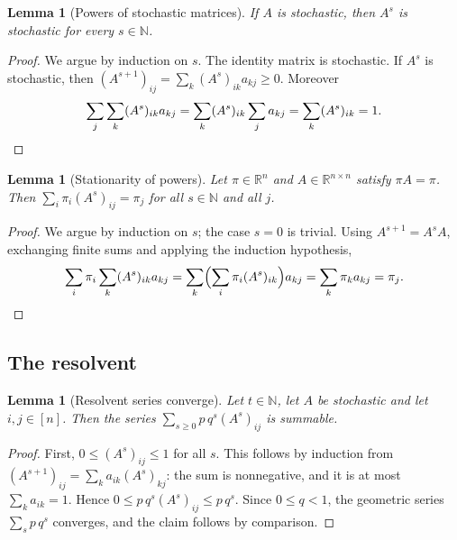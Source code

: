 \documentclass[11pt]{article}
\newtheorem{lemma}[theorem]{Lemma}
\theoremstyle{definition}
\theoremstyle{remark}
\newcommand{\R}{\mathbb{R}}
\newcommand{\N}{\mathbb{N}}
\begin{document}
\begin{lemma}[Powers of stochastic matrices]\label{lem:mc_pow_stochastic}
If $A$ is stochastic, then $A^s$ is stochastic for every $s\in\N$.
\end{lemma}
\begin{proof}
We argue by induction on $s$. The identity matrix is stochastic. If $A^s$ is stochastic, then $(A^{s+1})_{ij}=\sum_k(A^s)_{ik}a_{kj}\ge0$. Moreover
\[
\sum_j\sum_k(A^s)_{ik}a_{kj}=\sum_k(A^s)_{ik}\sum_ja_{kj}=\sum_k(A^s)_{ik}=1. \qedhere
\]
\end{proof}

\begin{lemma}[Stationarity of powers]\label{lem:mc_pow_stationary}
Let $\pi\in\R^n$ and $A\in\R^{n\times n}$ satisfy $\pi A=\pi$. Then $\sum_i\pi_i(A^s)_{ij}=\pi_j$ for all $s\in\N$ and all $j$.
\end{lemma}
\begin{proof}
We argue by induction on $s$; the case $s=0$ is trivial. Using $A^{s+1}=A^sA$, exchanging finite sums and applying the induction hypothesis,
\[
\sum_i\pi_i\sum_k(A^s)_{ik}a_{kj}=\sum_k\Bigl(\sum_i\pi_i(A^s)_{ik}\Bigr)a_{kj}=\sum_k\pi_ka_{kj}=\pi_j. \qedhere
\]
\end{proof}

\subsection{The resolvent}

\begin{lemma}[Resolvent series converge]\label{lem:mc_resolvent_summable}
Let $t\in\N$, let $A$ be stochastic and let $i,j\in[n]$. Then the series $\sum_{s\ge0}p\,q^s(A^s)_{ij}$ is summable.
\end{lemma}
\begin{proof}
First, $0\le(A^s)_{ij}\le1$ for all $s$. This follows by induction from $(A^{s+1})_{ij}=\sum_ka_{ik}(A^s)_{kj}$: the sum is nonnegative, and it is at most $\sum_ka_{ik}=1$. Hence $0\le p\,q^s(A^s)_{ij}\le p\,q^s$. Since $0\le q<1$, the geometric series $\sum_s p\,q^s$ converges, and the claim follows by comparison.
\end{proof}
\end{document}
